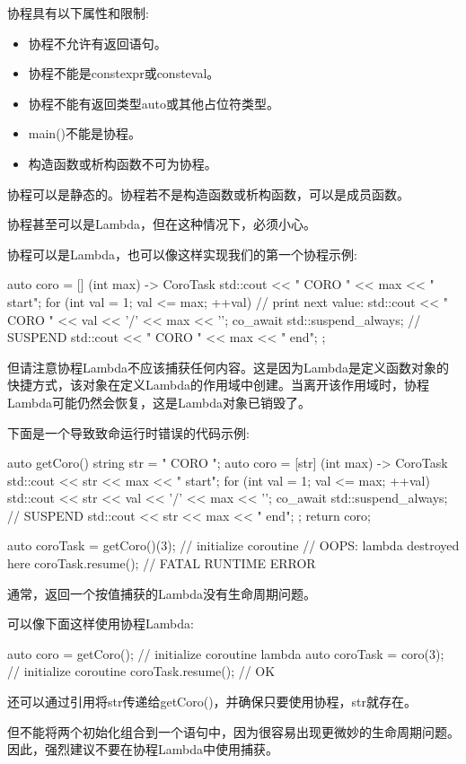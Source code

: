 
协程具有以下属性和限制:

\begin{itemize}
\item 
协程不允许有返回语句。

\item 
协程不能是constexpr或consteval。

\item 
协程不能有返回类型auto或其他占位符类型。

\item 
main()不能是协程。

\item 
构造函数或析构函数不可为协程。
\end{itemize}

协程可以是静态的。协程若不是构造函数或析构函数，可以是成员函数。

协程甚至可以是Lambda，但在这种情况下，必须小心。


协程可以是Lambda，也可以像这样实现我们的第一个协程示例:

\begin{cpp}
auto coro = [] (int max) -> CoroTask {
				std::cout << "          CORO " << max << " start\n";
				for (int val = 1; val <= max; ++val) {
					// print next value:
					std::cout << " CORO " << val << '/' << max << '\n';
					co_await std::suspend_always{}; // SUSPEND
				}
				std::cout << "         CORO " << max << " end\n";
};
\end{cpp}

但请注意协程Lambda不应该捕获任何内容。这是因为Lambda是定义函数对象的快捷方式，该对象在定义Lambda的作用域中创建。当离开该作用域时，协程Lambda可能仍然会恢复，这是Lambda对象已销毁了。

下面是一个导致致命运行时错误的代码示例:

\begin{cpp}
auto getCoro()
{
	string str = "      CORO ";
	auto coro = [str] (int max) -> CoroTask {
				std::cout << str << max << " start\n";
				for (int val = 1; val <= max; ++val) {
					std::cout << str << val << '/' << max << '\n';
					co_await std::suspend_always{}; // SUSPEND
				}
				std::cout << str << max << " end\n";
			};
	return coro;
}

auto coroTask = getCoro()(3); // initialize coroutine
// OOPS: lambda destroyed here
coroTask.resume(); // FATAL RUNTIME ERROR
\end{cpp}

通常，返回一个按值捕获的Lambda没有生命周期问题。

可以像下面这样使用协程Lambda:

\begin{cpp}
auto coro = getCoro(); // initialize coroutine lambda
auto coroTask = coro(3); // initialize coroutine
coroTask.resume(); // OK
\end{cpp}

还可以通过引用将str传递给getCoro()，并确保只要使用协程，str就存在。

但不能将两个初始化组合到一个语句中，因为很容易出现更微妙的生命周期问题。因此，强烈建议不要在协程Lambda中使用捕获。


